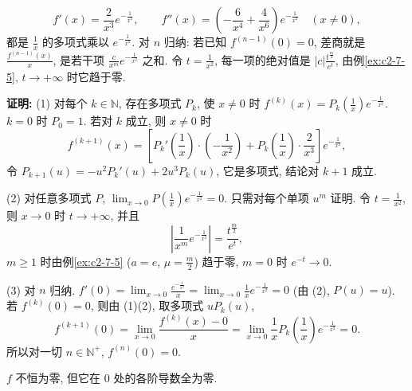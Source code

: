 \documentclass[UTF8,openany]{ctexbook}
\theoremstyle{chinesetextbook}
\newenvironment{cnproof}{\par\indent\textbf{证明:} \ignorespaces}{\par}
\begin{document}
\[
f'(x)=\frac2{x^3}e^{-\frac1{x^2}},\qquad f''(x)=\left(-\frac6{x^4}+\frac4{x^6}\right)e^{-\frac1{x^2}}\quad(x\ne0),
\]
都是 $\displaystyle\frac1x$ 的多项式乘以 $e^{-\frac1{x^2}}$. 对 $n$ 归纳: 若已知 $f^{(n-1)}(0)=0$, 差商就是 $\displaystyle\frac{f^{(n-1)}(x)}x$, 是若干项 $\displaystyle\frac c{x^m}e^{-\frac1{x^2}}$ 之和. 令 $\displaystyle t=\frac1{x^2}$, 每一项的绝对值是 $\displaystyle|c|\frac{t^{\frac m2}}{e^t}$, 由例\ref{ex:c2-7-5}, $t\to+\infty$ 时它趋于零.
\begin{cnproof}
(1) 对每个 $k\in\mathbb N$, 存在多项式 $P_k$, 使 $x\ne0$ 时 $\displaystyle f^{(k)}(x)=P_k\left(\frac1x\right)e^{-\frac1{x^2}}$. $k=0$ 时 $P_0=1$. 若对 $k$ 成立, 则 $x\ne0$ 时
\[
f^{(k+1)}(x)=\left[P_k'\left(\frac1x\right)\cdot\left(-\frac1{x^2}\right)+P_k\left(\frac1x\right)\cdot\frac2{x^3}\right]e^{-\frac1{x^2}},
\]
令 $P_{k+1}(u)=-u^2P_k'(u)+2u^3P_k(u)$, 它是多项式, 结论对 $k+1$ 成立.

(2) 对任意多项式 $P$, $\displaystyle\lim_{x\to0}P\left(\frac1x\right)e^{-\frac1{x^2}}=0$. 只需对每个单项 $u^m$ 证明. 令 $\displaystyle t=\frac1{x^2}$, 则 $x\to0$ 时 $t\to+\infty$, 并且
\[
\left|\frac1{x^m}e^{-\frac1{x^2}}\right|=\frac{t^{\frac m2}}{e^t},
\]
$m\ge1$ 时由例\ref{ex:c2-7-5} ($a=e$, $\displaystyle\mu=\frac m2$) 趋于零, $m=0$ 时 $e^{-t}\to0$.

(3) 对 $n$ 归纳. $\displaystyle f'(0)=\lim_{x\to0}\frac{e^{-\frac1{x^2}}}x=\lim_{x\to0}\frac1xe^{-\frac1{x^2}}=0$ (由 (2), $P(u)=u$). 若 $f^{(k)}(0)=0$, 则由 (1)(2), 取多项式 $uP_k(u)$,
\[
f^{(k+1)}(0)=\lim_{x\to0}\frac{f^{(k)}(x)-0}x=\lim_{x\to0}\frac1xP_k\left(\frac1x\right)e^{-\frac1{x^2}}=0.
\]
所以对一切 $n\in\mathbb N^+$, $f^{(n)}(0)=0$.
\end{cnproof}
$f$ 不恒为零, 但它在 $0$ 处的各阶导数全为零.
\end{document}
